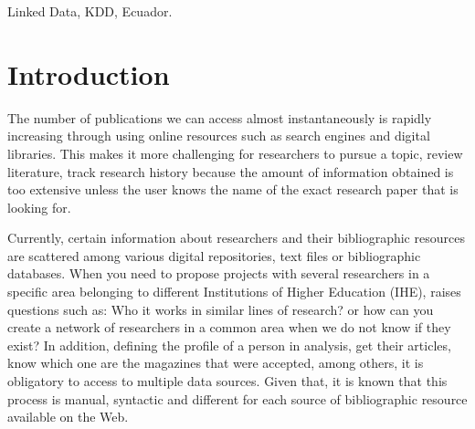 \documentclass[11pt]{article}
\begin{document}
\begin{keywords}
Linked Data, KDD, Ecuador.
\end{keywords}


\section{Introduction}
\label{sec:Intro}


The number of publications we can access almost instantaneously is rapidly increasing through using online resources such as search engines and digital libraries. This makes it more challenging for researchers to pursue a topic, review literature, track research history because the amount of information obtained is too extensive unless the user knows the name of the exact research paper that is looking for.


Currently, certain information about researchers and their bibliographic resources are scattered among various digital repositories, text files or bibliographic databases. When you need to propose projects with several researchers in a specific area belonging to different Institutions of Higher Education (IHE), raises questions such as: Who it works in similar lines of research? or how can you create a network of researchers in a common area when we do not know if they exist? In addition, defining the profile of a person in analysis, get their articles, know which one are the magazines that were accepted, among others, it is obligatory to access to multiple data sources. Given that, it is known that this process is manual, syntactic and different for each source of bibliographic resource available on the Web.
\end{document}
